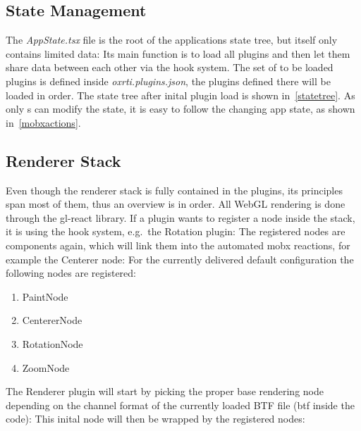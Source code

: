 \subsection{State Management}\label{sec_state}
The \emph{AppState.tsx} file is the root of the applications state tree, but
itself only contains limited data:
Its main function is to load all plugins and then let them share data between
each other via the hook system. The set of to be loaded plugins is defined inside
\emph{oxrti.plugins.json}, the plugins defined there will be loaded in order.
The state tree after inital plugin load is shown in~\autoref{statetree}.
As only s can modify the state, it is easy to follow the changing
app state, as shown in~\autoref{mobxactions}.

\subsection{Renderer Stack}\label{sec_rendererstack}
Even though the renderer stack is fully contained in the plugins, its principles
span most of them, thus an overview is in order. All WebGL rendering is done
through the gl-react library. If a plugin wants to register a node inside the
stack, it is using the hook system, e.g.\ the Rotation plugin:
The registered nodes are components again, which will link them into the
automated mobx reactions, for example the Centerer node:
For the currently delivered default configuration the following nodes are
registered:
\begin{enumerate}
\item PaintNode
\item CentererNode
\item RotationNode
\item ZoomNode
\end{enumerate}
The Renderer plugin will start by picking the proper base rendering node
depending on the channel format of the currently loaded BTF file (btf inside the
code):
This inital node will then be wrapped by the registered nodes:

